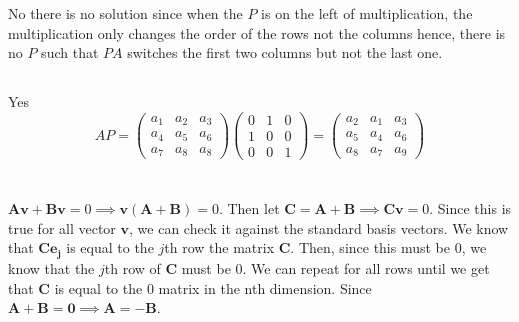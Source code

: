 \documentclass{article}
\begin{document}
\section{}
\subsection{}
No there is no solution since when the $P$ is on the left of multiplication, the multiplication only changes the order of the rows not the columns hence, there is no $P$ such that $PA$ switches the first two columns but not the last one. 
\subsection{}
Yes
\[AP = \begin{pmatrix}
    a_1&a_2&a_3 \\ a_4&a_5&a_6 \\ a_7&a_8&a_8
\end{pmatrix} \begin{pmatrix}
    0&1&0 \\ 1&0&0 \\ 0&0&1
\end{pmatrix}  = \begin{pmatrix}
    a_2&a_1&a_3 \\ a_5&a_4&a_6 \\ a_8&a_7&a_9
\end{pmatrix}\]
\section{}
 \(\mathbf{Av} + \mathbf{Bv} = 0 \implies \mathbf{v(A+B)} = 0\). Then let \(\mathbf{C = A+B} \implies \mathbf{Cv}=0\). Since this is true for all vector \(\mathbf{v}\), we can check it against the standard basis vectors. We know that \(\mathbf{Ce_j}\) is equal to the \(j\)th row the matrix $\mathbf{C}$. Then, since this must be $0$, we know that the $j$th row of $\mathbf{C}$ must be $0$. We can repeat for all rows until we get that $\mathbf{C}$ is equal to the $0$ matrix in the nth dimension. Since $\mathbf{A+B = 0} \implies \mathbf{A = -B}$. 
 
\end{document}
